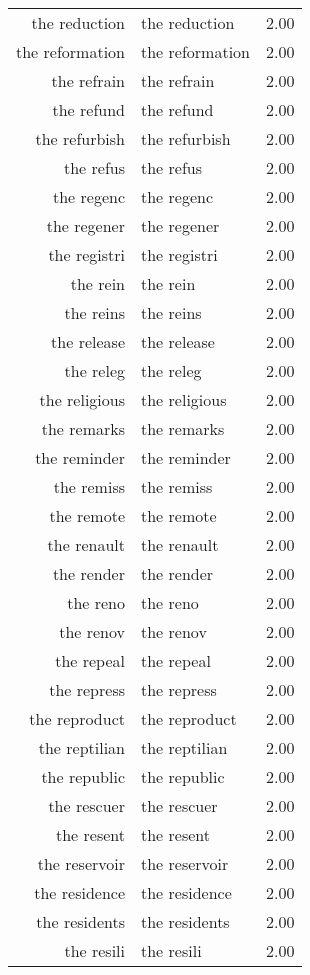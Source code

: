\begin{table}[ht]
\begin{tabular}{rlr}
  the reduction & the reduction & 2.00 \\ 
  the reformation & the reformation & 2.00 \\ 
  the refrain & the refrain & 2.00 \\ 
  the refund & the refund & 2.00 \\ 
  the refurbish & the refurbish & 2.00 \\ 
  the refus & the refus & 2.00 \\ 
  the regenc & the regenc & 2.00 \\ 
  the regener & the regener & 2.00 \\ 
  the registri & the registri & 2.00 \\ 
  the rein & the rein & 2.00 \\ 
  the reins & the reins & 2.00 \\ 
  the release & the release & 2.00 \\ 
  the releg & the releg & 2.00 \\ 
  the religious & the religious & 2.00 \\ 
  the remarks & the remarks & 2.00 \\ 
  the reminder & the reminder & 2.00 \\ 
  the remiss & the remiss & 2.00 \\ 
  the remote & the remote & 2.00 \\ 
  the renault & the renault & 2.00 \\ 
  the render & the render & 2.00 \\ 
  the reno & the reno & 2.00 \\ 
  the renov & the renov & 2.00 \\ 
  the repeal & the repeal & 2.00 \\ 
  the repress & the repress & 2.00 \\ 
  the reproduct & the reproduct & 2.00 \\ 
  the reptilian & the reptilian & 2.00 \\ 
  the republic & the republic & 2.00 \\ 
  the rescuer & the rescuer & 2.00 \\ 
  the resent & the resent & 2.00 \\ 
  the reservoir & the reservoir & 2.00 \\ 
  the residence & the residence & 2.00 \\ 
  the residents & the residents & 2.00 \\ 
  the resili & the resili & 2.00 \\ 

\end{tabular}
\end{table}
